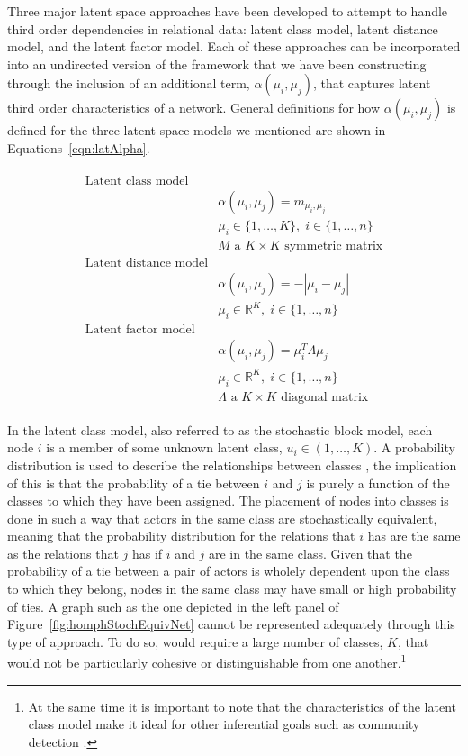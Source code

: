 Three major latent space approaches have been developed to attempt to handle third order dependencies in relational data: latent class model, latent distance model, and the latent factor model. Each of these approaches can be incorporated into an undirected version of the framework that we have been constructing through the inclusion of an additional term, $\alpha(\mu_{i}, \mu_{j})$, that captures latent third order characteristics of a network. General definitions for how $\alpha(\mu_{i}, \mu_{j})$ is defined for the three latent space models we mentioned are shown in Equations~\ref{eqn:latAlpha}. 

\begin{align}
\begin{aligned}
\text{Latent class model} \\
	&\alpha(\mu_{i}, \mu_{j}) = m_{\mu_{i}, \mu_{j}} \\
	&\mu_{i} \in \{1, \ldots, K \}, \; i \in \{1,\ldots, n\} \\
	&M \text{ a } K \times K \text{ symmetric matrix} \\
\text{Latent distance model} \\
	&\alpha(\mu_{i}, \mu_{j}) = -|\mu_{i} - \mu_{j}| \\
	&\mu_{i} \in \mathbb{R}^{K}, \; i \in \{1, \ldots, n \} \\
\text{Latent factor model} \\
	&\alpha(\mu_{i}, \mu_{j}) = \mu_{i}^{T} \Lambda \mu_{j} \\
	&\mu_{i} \in \mathbb{R}^{K}, \; i \in \{1, \ldots, n \} \\
	&\Lambda \text{ a } K \times K \text{ diagonal matrix}
\label{eqn:latAlpha}
\end{aligned}
\end{align}

In the latent class model, also referred to as the stochastic block model, each node $i$ is a member of some unknown latent class, $u_{i} \in (1,\ldots,K)$. A probability distribution is used to describe the relationships between classes  \citep{nowicki:snijders:2001}, the implication of this is that the probability of a tie between $i$ and $j$ is purely a function of the classes to which they have been assigned. The placement of nodes into classes is done in such a way that actors in the same class are stochastically equivalent, meaning that the probability distribution for the relations that $i$ has are the same as the relations that $j$ has if $i$ and $j$ are in the same class. Given that the probability of a tie between a pair of actors is wholely dependent upon the class to which they belong, nodes in the same class may have small or high probability of ties. A graph such as the one depicted in the left panel of Figure~\ref{fig:homphStochEquivNet} cannot be represented adequately through this type of approach. To do so, would require a large number of classes, $K$, that would not be particularly cohesive or distinguishable from one another.\footnote{At the same time it is important to note that the characteristics of the latent class model make it ideal for other inferential goals such as community detection \citep{airoldi:etal:2013}.}

